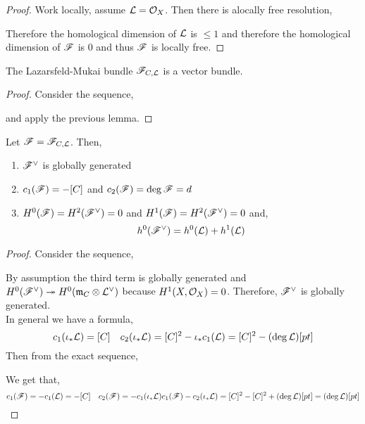 \documentclass[12pt]{article}
\begin{document}
\begin{proof}
Work locally, assume $\mathcal{L} = \mathcal{O}_{X}$. Then there is alocally free resolution,
\begin{center}
\end{center}
Therefore the homological dimension of $\mathcal{L}$ is $\le 1$ and therefore the homological dimension of $\mathscr{F}$ is $0$ and thus $\mathscr{F}$ is locally free.
\end{proof}

\begin{cor}
The Lazarsfeld-Mukai bundle $\mathscr{F}_{C,\mathcal{L}}$ is a vector bundle.
\end{cor}

\begin{proof}
Consider the sequence,
\begin{center}
\end{center}
and apply the previous lemma.
\end{proof}

\begin{lemma}
Let $\mathscr{F} = \mathscr{F}_{C, \mathcal{L}}$. Then,
\begin{enumerate}
\item $\mathscr{F}^\vee$ is globally generated
\item $c_1(\mathscr{F}) = -[C]$ and $c_2(\mathscr{F}) = \deg{\mathscr{F}} = d$
\item $H^0(\mathscr{F}) = H^2(\mathscr{F}^\vee) = 0$ and $H^1(\mathscr{F}) = H^2(\mathscr{F}^\vee) = 0$ and,
\[ h^0(\mathscr{F}^\vee) = h^0(\mathcal{L}) + h^1(\mathcal{L}) \]
\end{enumerate}
\end{lemma}

\begin{proof}
Consider the sequence,
\begin{center}
\end{center}
By assumption the third term is globally generated and $H^0(\mathscr{F}^\vee) \twoheadrightarrow H^0(\mathfrak{m}
_C \otimes \mathcal{L}^\vee)$ because $H^1(X, \mathcal{O}_{X}) = 0$. Therefore, $\mathscr{F}^\vee$ is globally generated.
\bigskip\\
In general we have a formula,
\[ c_1(\iota_* \mathcal{L}) = [C] \quad c_2(\iota_* \mathcal{L}) = [C]^2 - \iota_* c_1(\mathcal{L}) = [C]^2 - (\deg{\mathcal{L}}) [pt] \]
Then from the exact sequence,
\begin{center}
\end{center}
We get that,
\[ c_1(\mathscr{F}) = - c_1(\mathcal{L}) = -[C] \quad c_2(\mathscr{F}) = -c_1(\iota_* \mathcal{L}) c_1(\mathscr{F}) - c_2(\iota_* \mathcal{L}) = [C]^2  - [C]^2 + (\deg{\mathcal{L}}) [pt] = (\deg{\mathcal{L}}) [pt] \]
\end{proof}
\end{document}
